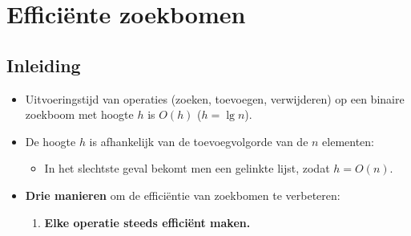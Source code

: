 \chapter{Efficiënte zoekbomen}
\section{Inleiding}
\begin{itemize}
    \item Uitvoeringstijd van operaties (zoeken, toevoegen, verwijderen) op een binaire zoekboom met hoogte $h$ is $O(h)$ ($h = \lg n$).
    \item De hoogte $h$ is afhankelijk van de toevoegvolgorde van de $n$ elementen:
    \begin{itemize}
        \item In het slechtste geval bekomt men een gelinkte lijst, zodat $h = O(n)$.
    \end{itemize}
    \item \textbf{Drie manieren} om de efficiëntie van zoekbomen te verbeteren:
    \begin{enumerate}
        \item \textbf{Elke operatie steeds efficiënt maken.}
        \begin{itemize}

\end{itemize}
\end{enumerate}
\end{itemize}
